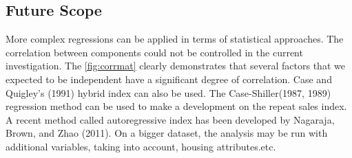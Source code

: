 \documentclass[12pt]{article}
\begin{document}
\subsection{Future Scope}
More complex regressions can be applied in terms of statistical approaches. The correlation between components could not be controlled in the current investigation. The \autoref{fig:corrmat} clearly demonstrates that several factors that we expected to be independent have a significant degree of correlation. Case and Quigley's (1991) hybrid index can also be used.
The Case-Shiller(1987, 1989) regression method can be used to make a development on the repeat sales index. A recent method called autoregressive index has been developed by Nagaraja, Brown, and Zhao (2011).
On a bigger dataset, the analysis may be run with additional variables, taking into account, housing attributes.etc.
\end{document}
